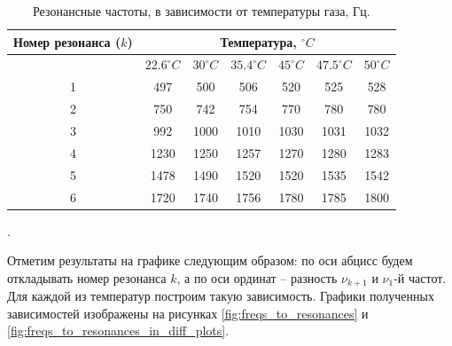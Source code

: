 \documentclass[a4paper, 12pt]{article}
\newcounter{Points}
\newcommand{\point}{\arabic{Points}. \addtocounter{Points}{1}}
\begin{document}
\begin{table}[h]
    \centering
    \begin{tabular}{|c|c|c|c|c|c|c|}
    \hline 
    Номер резонанса ($k$)   & \multicolumn{6}{|c|}{Температура, $^\circ C$} \\ \hline
                            & $22.6^{\circ} C$ & $30^{\circ} C$ & $35.4^{\circ} C$ & $45^{\circ} C$ & $47.5^{\circ} C$ & $50^{\circ} C$  \\ \hline

    1	&	 497	&	 500	&	 506	&	 520	&	 525	&	 528	\\ \hline
    2	&	 750	&	 742	&	 754	&	 770	&	 780	&	 780	\\ \hline
    3	&	 992	&	1000	&	1010	&	1030	&	1031	&	1032	\\ \hline
    4	&	1230	&	1250	&	1257	&	1270	&	1280	&	1283	\\ \hline
    5	&	1478	&	1490	&	1520	&	1520	&	1535	&	1542	\\ \hline
    6	&	1720	&	1740	&	1756	&	1780	&	1785	&	1800	\\ \hline
                            
    \end{tabular}
	\caption{Резонансные частоты, в зависимости от температуры газа, Гц.}
    \label{tabl:data}
\end{table}

\point Отметим результаты на графике следующим образом: по оси абцисс будем откладывать номер резонанса $k$, а по оси ординат -- разность $\nu_{k + 1}$ и $\nu_1$-й частот. Для каждой из температур построим такую зависимость. Графики полученных зависимостей изображены на рисунках \ref{fig:freqs_to_resonances} и \ref{fig:freqs_to_resonances_in_diff_plots}.
\end{document}
